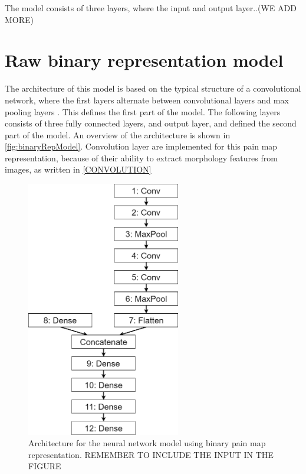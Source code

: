 The model consists of three layers, where the input and output layer..(WE ADD MORE)

\section{Raw binary representation model}\label{sec:BinaryRepModel}
The architecture of this model is based on the typical structure of a convolutional network, where the first layers alternate between convolutional layers and max pooling layers \citep{LeCun2015}. This defines the first part of the model. The following layers consists of three fully connected layers, and output layer, and defined the second part of the model. An overview of the architecture is shown in \autoref{fig:binaryRepModel}. 
Convolution layer are implemented for this pain map representation, because of their ability to extract morphology features from images, as written in \autoref{CONVOLUTION}

\begin{figure} [H]
\centering
\includegraphics[width=0.6\textwidth]{figures/binaryRepModel}
\caption{Architecture for the neural network model using binary pain map representation. REMEMBER TO INCLUDE THE INPUT IN THE FIGURE}
\label{fig:binaryRepModel} 
\end{figure}

